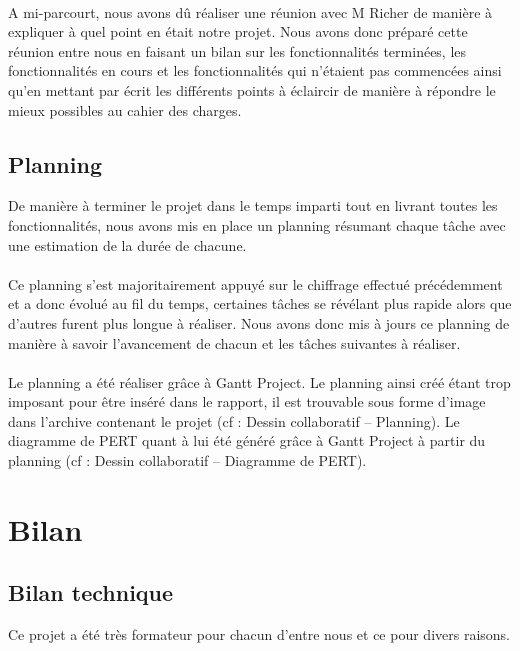 \documentclass[a4paper,11pt]{article}
\begin{document}
\paragraph{} A mi-parcourt, nous avons dû réaliser une réunion avec M Richer de manière à expliquer à quel point en était notre projet. Nous avons donc préparé cette réunion entre nous en faisant un bilan sur les fonctionnalités terminées, les fonctionnalités en cours et les fonctionnalités qui n'étaient pas commencées ainsi qu'en mettant par écrit les différents points à éclaircir de manière à répondre le mieux possibles au cahier des charges.

\subsection{Planning}
De manière à terminer le projet dans le temps imparti tout en livrant toutes les fonctionnalités, nous avons mis en place un planning résumant chaque tâche avec une estimation de la durée de chacune.

\paragraph{} Ce planning s'est majoritairement appuyé sur le chiffrage effectué précédemment et a donc évolué au fil du temps, certaines tâches se révélant plus rapide alors que d'autres furent plus longue à réaliser. Nous avons donc mis à jours ce planning de manière à savoir l'avancement de chacun et les tâches suivantes à réaliser.

\paragraph{} Le planning a été réaliser grâce à Gantt Project. Le planning ainsi créé étant trop imposant pour être inséré dans le rapport, il est trouvable sous forme d'image dans l'archive contenant le projet (cf : Dessin collaboratif – Planning). Le diagramme de PERT quant à lui été généré grâce à Gantt Project à partir du planning (cf : Dessin collaboratif – Diagramme de PERT).

\section{Bilan}
\subsection{Bilan technique}
Ce projet a été très formateur pour chacun d'entre nous et ce pour divers raisons. 
\end{document}
